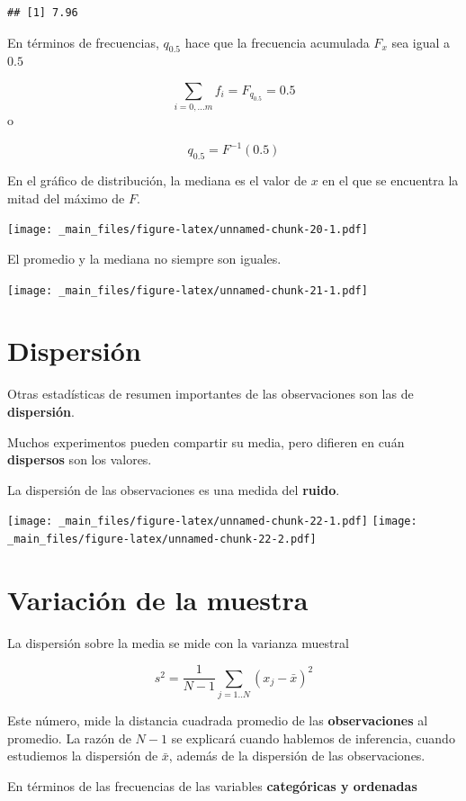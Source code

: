 \documentclass[
]{book}
\begin{document}
\begin{verbatim}
## [1] 7.96
\end{verbatim}

En términos de frecuencias, \(q_{0.5}\) hace que la frecuencia acumulada \(F_x\) sea igual a \(0.5\)

\[\sum_{i = 0, ... m} f_i =F_{q_{0.5}}=0.5\]
o

\[q_{0.5}=F^{-1}(0.5)\]

En el gráfico de distribución, la mediana es el valor de \(x\) en el que se encuentra la mitad del máximo de \(F\).

\texttt{[image: \_main\_files/figure-latex/unnamed-chunk-20-1.pdf]}

El promedio y la mediana no siempre son iguales.

\texttt{[image: \_main\_files/figure-latex/unnamed-chunk-21-1.pdf]}

\hypertarget{dispersiuxf3n}{%
\section{Dispersión}\label{dispersiuxf3n}}

Otras estadísticas de resumen importantes de las observaciones son las de \textbf{dispersión}.

Muchos experimentos pueden compartir su media, pero difieren en cuán \textbf{dispersos} son los valores.

La dispersión de las observaciones es una medida del \textbf{ruido}.

\texttt{[image: \_main\_files/figure-latex/unnamed-chunk-22-1.pdf]} \texttt{[image: \_main\_files/figure-latex/unnamed-chunk-22-2.pdf]}

\hypertarget{variaciuxf3n-de-la-muestra}{%
\section{Variación de la muestra}\label{variaciuxf3n-de-la-muestra}}

La dispersión sobre la media se mide con la varianza muestral

\[s^2=\frac{1}{N-1} \sum_{j=1..N} (x_j-\bar{x})^2\]

Este número, mide la distancia cuadrada promedio de las \textbf{observaciones} al promedio. La razón de \(N-1\) se explicará cuando hablemos de inferencia, cuando estudiemos la dispersión de \(\bar{x}\), además de la dispersión de las observaciones.

En términos de las frecuencias de las variables \textbf{categóricas y ordenadas}
\end{document}
